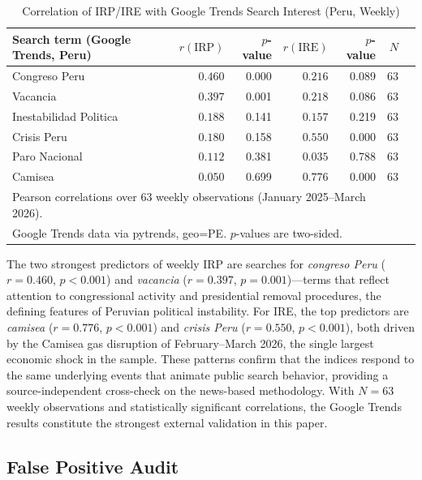 \documentclass[12pt,a4paper]{article}
\begin{document}
\begin{table}[h!]
\centering
\caption{Correlation of IRP/IRE with Google Trends Search Interest (Peru, Weekly)}
\label{tab:trends}
\small
\begin{tabular}{lrrrrrr}
\toprule
Search term (Google Trends, Peru) & $r(\text{IRP})$ & $p$-value & $r(\text{IRE})$ & $p$-value & $N$ \\
\midrule
Congreso Peru & $0.460$ & 0.000 & $0.216$ & 0.089 & 63 \\
Vacancia & $0.397$ & 0.001 & $0.218$ & 0.086 & 63 \\
Inestabilidad Politica & $0.188$ & 0.141 & $0.157$ & 0.219 & 63 \\
Crisis Peru & $0.180$ & 0.158 & $0.550$ & 0.000 & 63 \\
Paro Nacional & $0.112$ & 0.381 & $0.035$ & 0.788 & 63 \\
Camisea & $0.050$ & 0.699 & $0.776$ & 0.000 & 63 \\
\bottomrule
\multicolumn{6}{l}{\footnotesize Pearson correlations over 63 weekly observations (January 2025--March 2026).} \\
\multicolumn{6}{l}{\footnotesize Google Trends data via pytrends, geo=PE. $p$-values are two-sided.}
\end{tabular}
\end{table}

The two strongest predictors of weekly IRP are searches for
\emph{congreso Peru} ($r = 0.460$, $p < 0.001$) and \emph{vacancia}
($r = 0.397$, $p = 0.001$)---terms that reflect attention to
congressional activity and presidential removal procedures, the defining
features of Peruvian political instability.  For IRE, the top
predictors are \emph{camisea} ($r = 0.776$, $p < 0.001$) and
\emph{crisis Peru} ($r = 0.550$, $p < 0.001$), both driven by the
Camisea gas disruption of February--March 2026, the single largest
economic shock in the sample.  These patterns confirm that the indices
respond to the same underlying events that animate public search
behavior, providing a source-independent cross-check on the news-based
methodology.  With $N = 63$ weekly observations and statistically
significant correlations, the Google Trends results constitute the
strongest external validation in this paper.

\subsection{False Positive Audit}
\label{subsec:fp_audit}
\end{document}
